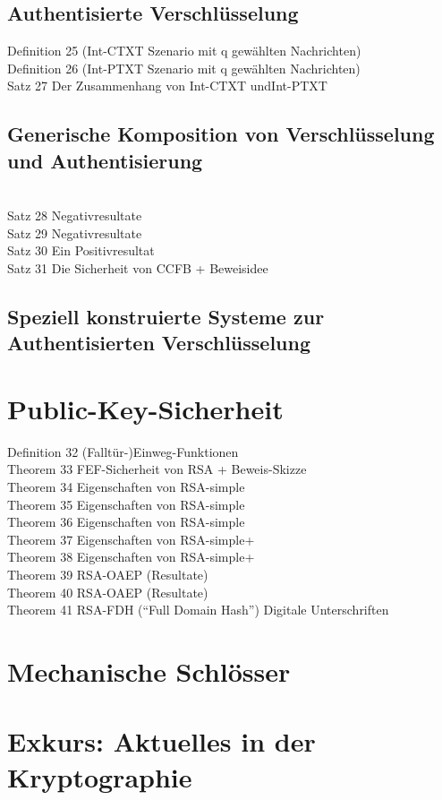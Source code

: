 \documentclass[10pt,a4paper]{article}
\begin{document}
\subsection{Authentisierte Verschlüsselung}
Definition 25 (Int-CTXT Szenario mit q gewählten Nachrichten)\\
Definition 26 (Int-PTXT Szenario mit q gewählten Nachrichten)\\
Satz 27 Der Zusammenhang von Int-CTXT undInt-PTXT
\subsection{Generische Komposition von
Verschlüsselung und Authentisierung}\\
Satz 28 Negativresultate\\
Satz 29 Negativresultate\\
Satz 30 Ein Positivresultat\\
Satz 31 Die Sicherheit von CCFB + Beweisidee
\subsection{Speziell konstruierte Systeme zur
Authentisierten Verschlüsselung}
\section{Public-Key-Sicherheit}
Definition 32 (Falltür-)Einweg-Funktionen\\
Theorem 33 FEF-Sicherheit von RSA + Beweis-Skizze\\
Theorem 34 Eigenschaften von RSA-simple\\
Theorem 35 Eigenschaften von RSA-simple\\
Theorem 36 Eigenschaften von RSA-simple\\
Theorem 37 Eigenschaften von RSA-simple+\\
Theorem 38 Eigenschaften von RSA-simple+\\
Theorem 39 RSA-OAEP (Resultate)\\
Theorem 40 RSA-OAEP (Resultate)\\
Theorem 41 RSA-FDH (“Full Domain Hash”) Digitale Unterschriften
\section{Mechanische Schlösser}
\section{Exkurs: Aktuelles in der Kryptographie}
\end{document}
